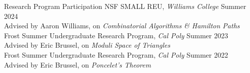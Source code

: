 \documentclass[
	11pt, %
]{cv} %
\begin{document}
\begin{rSection}{Research Program Participation}{}{}{}
	NSF SMALL REU, \textit{Williams College} \dotfill Summer 2024 \\
	\-\hspace{1cm}Advised by Aaron Williams, on \textit{Combinatorial Algorithms \& Hamilton Paths} \\
	Frost Summer Undergraduate Research Program, \textit{Cal Poly} \dotfill Summer 2023 \\
	\-\hspace{1cm}Advised by Eric Brussel, on \textit{Moduli Space of Triangles} \\
	Frost Summer Undergraduate Research Program, \textit{Cal Poly} \dotfill Summer 2022 \\
	\-\hspace{1cm}Advised by Eric Brussel, on \textit{Poncelet's Theorem}
\end{rSection}
\end{document}
